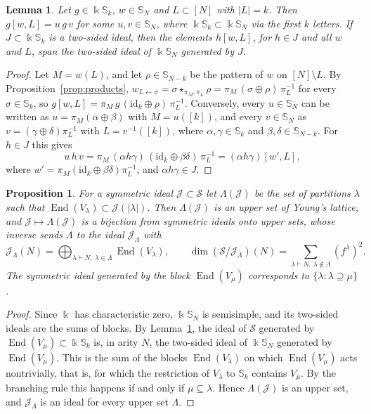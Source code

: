 \documentclass[11pt]{amsart}
\newtheorem{proposition}[theorem]{Proposition}
\newtheorem{lemma}[theorem]{Lemma}
\theoremstyle{definition}
\theoremstyle{remark}
\newcommand{\bS}{\mathbb{S}}
\newcommand{\kk}{\Bbbk}
\newcommand{\cJ}{\mathscr{J}}
\newcommand{\cS}{\mathscr{S}}
\newcommand{\id}{\mathrm{id}}
\newcommand{\End}{\operatorname{End}}
\begin{document}
\begin{lemma}\label{lem:young}
Let $g\in\kk\bS_k$, $w\in\bS_N$ and $L\subset[N]$ with $|L|=k$. Then $g[w,L]=u\,g\,v$ for some $u,v\in\bS_N$, where $\kk\bS_k\subset\kk\bS_N$ via the first $k$ letters. If $J\subset\kk\bS_k$ is a two-sided ideal, then the elements $h[w,L]$, for $h\in J$ and all $w$ and $L$, span the two-sided ideal of $\kk\bS_N$ generated by $J$.
\end{lemma}

\begin{proof}
Let $M=w(L)$, and let $\rho\in\bS_{N-k}$ be the pattern of $w$ on $[N]\setminus L$. By Proposition~\ref{prop:products}, $w_{L\leftarrow\sigma}=\sigma\star_{\pi_M,\pi_L}\rho=\pi_M\,(\sigma\oplus\rho)\,\pi_L^{-1}$ for every $\sigma\in\bS_k$, so $g[w,L]=\pi_M\,g\,(\id_k\oplus\rho)\,\pi_L^{-1}$. Conversely, every $u\in\bS_N$ can be written as $u=\pi_M(\alpha\oplus\beta)$ with $M=u([k])$, and every $v\in\bS_N$ as $v=(\gamma\oplus\delta)\pi_L^{-1}$ with $L=v^{-1}([k])$, where $\alpha,\gamma\in\bS_k$ and $\beta,\delta\in\bS_{N-k}$. For $h\in J$ this gives
\[
u\,h\,v=\pi_M\,(\alpha h\gamma)\,(\id_k\oplus\beta\delta)\,\pi_L^{-1}=(\alpha h\gamma)[w',L],
\]
where $w'=\pi_M(\id_k\oplus\beta\delta)\pi_L^{-1}$, and $\alpha h\gamma\in J$.
\end{proof}

\begin{proposition}\label{prop:symideals}
For a symmetric ideal $\cJ\subset\cS$ let $\Lambda(\cJ)$ be the set of partitions $\lambda$ such that $\End(V_\lambda)\subset\cJ(|\lambda|)$. Then $\Lambda(\cJ)$ is an upper set of Young's lattice, and $\cJ\mapsto\Lambda(\cJ)$ is a bijection from symmetric ideals onto upper sets, whose inverse sends $\Lambda$ to the ideal $\cJ_\Lambda$ with
\[
\cJ_\Lambda(N)=\bigoplus_{\lambda\vdash N,\ \lambda\in\Lambda}\End(V_\lambda),\qquad \dim(\cS/\cJ_\Lambda)(N)=\sum_{\lambda\vdash N,\ \lambda\notin\Lambda}(f^\lambda)^2 .
\]
The symmetric ideal generated by the block $\End(V_\mu)$ corresponds to $\{\lambda:\lambda\supseteq\mu\}$.
\end{proposition}

\begin{proof}
Since $\kk$ has characteristic zero, $\kk\bS_N$ is semisimple, and its two-sided ideals are the sums of blocks. By Lemma~\ref{lem:young}, the ideal of $\cS$ generated by $\End(V_\mu)\subset\kk\bS_k$ is, in arity $N$, the two-sided ideal of $\kk\bS_N$ generated by $\End(V_\mu)$. This is the sum of the blocks $\End(V_\lambda)$ on which $\End(V_\mu)$ acts nontrivially, that is, for which the restriction of $V_\lambda$ to $\bS_k$ contains $V_\mu$. By the branching rule this happens if and only if $\mu\subseteq\lambda$. Hence $\Lambda(\cJ)$ is an upper set, and $\cJ_\Lambda$ is an ideal for every upper set $\Lambda$.
\end{proof}
\end{document}
